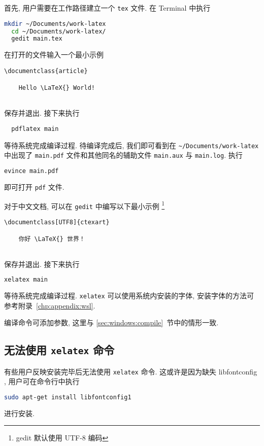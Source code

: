 首先, 用户需要在工作路径建立一个 \texttt{tex} 文件.
在 \textsf{Terminal} 中执行
\begin{lstlisting}[language = bash]
  mkdir ~/Documents/work-latex
  cd ~/Documents/work-latex/
  gedit main.tex
\end{lstlisting}
在打开的文件输入一个最小示例
\begin{lstlisting}[language = {[LaTeX]TeX}]
  \documentclass{article}
  
    Hello \LaTeX{} World!
  
\end{lstlisting}
保存并退出. 
接下来执行
\begin{lstlisting}
  pdflatex main
\end{lstlisting}
等待系统完成编译过程. 
待编译完成后,
我们即可看到在 \texttt{\~{}/Documents/work-latex} 中出现了
\texttt{main.pdf} 文件和其他同名的辅助文件 \texttt{main.aux} 与
\texttt{main.log}. 
执行
\begin{lstlisting}[language=bash]
  evince main.pdf
\end{lstlisting}
即可打开 \texttt{pdf} 文件.

对于中文文档, 可以在 \texttt{gedit} 中编写以下最小示例%
\footnote{gedit 默认使用 UTF-8 编码}%
\begin{lstlisting}[language={[LaTeX]TeX}]
  \documentclass[UTF8]{ctexart}
  
    你好 \LaTeX{} 世界！
  
\end{lstlisting}
保存并退出.
接下来执行
\begin{lstlisting}[language=bash]
  xelatex main
\end{lstlisting}
等待系统完成编译过程.
\texttt{xelatex} 可以使用系统内安装的字体,
安装字体的方法可参考附录~\ref{chp:appendix:wsl}.

编译命令可添加参数, 这里与 \ref{sec:windows:compile}~节中的情形一致.

\subsection{无法使用 \texttt{xelatex} 命令}\label{subsec:ubuntu:xelatexfail}

有些用户反映安装完毕后无法使用 \texttt{xelatex} 命令.
这或许是因为缺失 libfontconfig , 用户可在命令行中执行 
\begin{lstlisting}[language=bash]
  sudo apt-get install libfontconfig1
\end{lstlisting}
进行安装.

